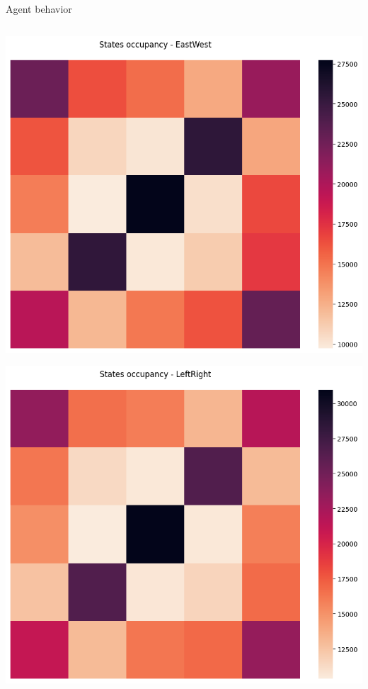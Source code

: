 \documentclass[bigger]{beamer}
\begin{document}
\begin{frame}[label={sec:org89e314c}]{Agent behavior}
\begin{columns}
\begin{column}[c]{0.25\columnwidth}
\begin{center}
\includegraphics[width=\linewidth]{img/states-occupancy-EastWest.png}
\end{center}
\begin{center}
\includegraphics[width=\linewidth]{img/states-occupancy-LefRight.png}
\end{center}
\end{column}
\end{columns}
\end{frame}
\end{document}
